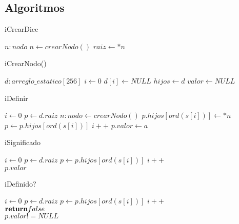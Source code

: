 \subsection{Algoritmos}


\begin{algorithm}
\caption{iCrearDicc}
\label{() -> res = diccString}
\begin{algorithmic}
\State $n : nodo$
\State $n \gets crearNodo()$
\State $raiz \gets *n$
\end{algorithmic}
\end{algorithm}


\begin{algorithm}
\caption{iCrearNodo()}
\label{() -> res = nodo}
\begin{algorithmic}
\State $d : arreglo\_estatico[256]$
\State $i \gets 0$
\State $d[i] \gets NULL$
\EndWhile
\State $hijos \gets d$
\State $valor \gets NULL$
\end{algorithmic}
\end{algorithm}

\begin{algorithm}
\caption{iDefinir}
\label{inout d: diccString(alfa), in c: string, in s: alfa}
\begin{algorithmic}
\State $i \gets 0$
\State $p \gets d.raiz$
\State $n: nodo \gets crearNodo()$
\State $p.hijos[ord(s[i])] \gets *n$
\EndIf
\State $p \gets p.hijos[ord(s[i])]$
\State $i++$
\EndWhile
\State $p.valor \gets a$
\end{algorithmic}
\end{algorithm}

\begin{algorithm}
\caption{iSignificado}
\label{in d: diccString(alfa), in c: string -> res = alfa}
\begin{algorithmic}
\State $i \gets 0$
\State $p \gets d.raiz$
\State $p \gets p.hijos[ord(s[i])]$
\State $i++$
\EndWhile\\
\Return $p.valor$
\end{algorithmic}
\end{algorithm}

\begin{algorithm}
\caption{iDefinido?}
\label{in d: diccString, in c: string -> res = bool}
\begin{algorithmic}
\State $i \gets 0$
\State $p \gets d.raiz$
\State $p \gets p.hijos[ord(s[i])]$
\State $i++$
\Else \\{$\Return false$}
\EndIf
\EndWhile\\
\Return $p.valor != NULL$
\end{algorithmic}
\end{algorithm}


